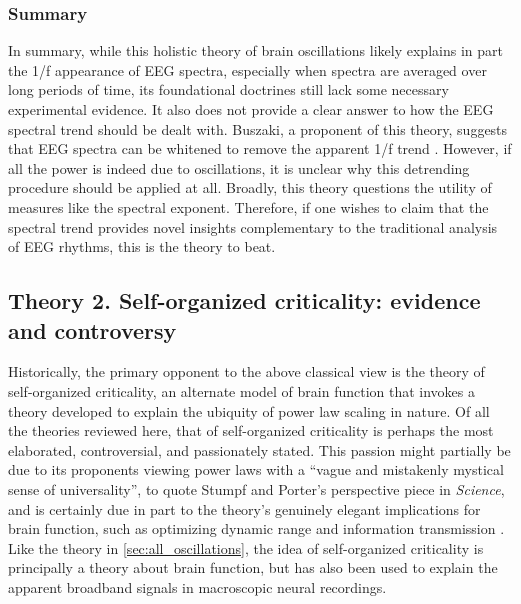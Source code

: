 \subsubsection{Summary}
In summary, while this holistic theory of brain oscillations likely explains in part the 1/f appearance of EEG spectra, especially when spectra are averaged over long periods of time, its foundational doctrines still lack some necessary experimental evidence. It also does not provide a clear answer to how the EEG spectral trend should be dealt with. Buszaki, a proponent of this theory, suggests that EEG spectra can be whitened to remove the apparent 1/f trend \cite{Buzsaki2006}. However, if all the power is indeed due to oscillations, it is unclear why this detrending procedure should be applied at all. Broadly, this theory questions the utility of measures like the spectral exponent. Therefore, if one wishes to claim that the spectral trend provides novel insights complementary to the traditional analysis of EEG rhythms, this is the theory to beat.

\subsection{Theory 2. Self-organized criticality: evidence and controversy} \label{sec:SOC}

Historically, the primary opponent to the above classical view is the theory of self-organized criticality, an alternate model of brain function that invokes a theory developed to explain the ubiquity of power law scaling in nature. Of all the theories reviewed here, that of self-organized criticality is perhaps the most elaborated, controversial, and passionately stated. This passion might partially be due to its proponents viewing power laws with a ``vague and mistakenly mystical sense of universality'', to quote Stumpf and Porter’s perspective piece in \textit{Science}\cite{Stumpf2012}, and is certainly due in part to the theory’s genuinely elegant implications for brain function, such as optimizing dynamic range \cite{Kinouchi2006} and information transmission \cite{Shriki2016}. Like the theory in \autoref{sec:all_oscillations}, the idea of self-organized criticality is principally a theory about brain function, but has also been used to explain the apparent broadband signals in macroscopic neural recordings. 

